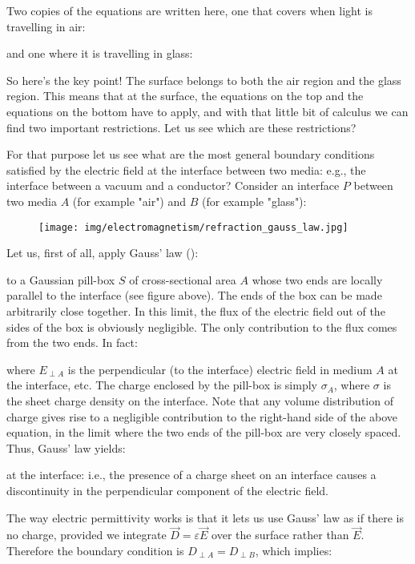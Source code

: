 	Two copies of the equations are written here, one that covers when light is travelling in air:
	
	 and one where it is travelling in glass:
	
	So here's the key point! The surface belongs to both the air region and the glass region. This means that at the surface, the equations on the top and the equations on the bottom have to apply, and with that little bit of calculus we can find two important restrictions. Let us see which are these restrictions?
	
	For that purpose let us see what are the most general boundary conditions satisfied by the electric field at the interface between two media: e.g., the interface between a vacuum and a conductor? Consider an interface $P$ between two media $A$ (for example "air") and $B$ (for example "glass"):
	\begin{figure}[H]
		\centering
		\texttt{[image: img/electromagnetism/refraction\_gauss\_law.jpg]}
	\end{figure}
	Let us, first of all, apply Gauss' law ():
	
	to a Gaussian pill-box $S$ of cross-sectional area $A$ whose two ends are locally parallel to the interface (see figure above). The ends of the box can be made arbitrarily close together. In this limit, the flux of the electric field out of the sides of the box is obviously negligible. The only contribution to the flux comes from the two ends. In fact:
		
	where $E_{\perp A}$ is the perpendicular (to the interface) electric field in medium $A$ at the interface, etc. The charge enclosed by the pill-box is simply $\sigma_A$, where $\sigma$ is the sheet charge density on the interface. Note that any volume distribution of charge gives rise to a negligible contribution to the right-hand side of the above equation, in the limit where the two ends of the pill-box are very closely spaced. Thus, Gauss' law yields:
		
	at the interface: i.e., the presence of a charge sheet on an interface causes a discontinuity in the perpendicular component of the electric field. 
	
	The way electric permittivity works is that it lets us use Gauss' law as if there is no charge, provided we integrate $\vec{D}=\varepsilon\vec{E}$ over the surface rather than $\vec{E}$. Therefore the boundary condition is $D_{\perp A}=D_{\perp  B}$, which implies:
	
